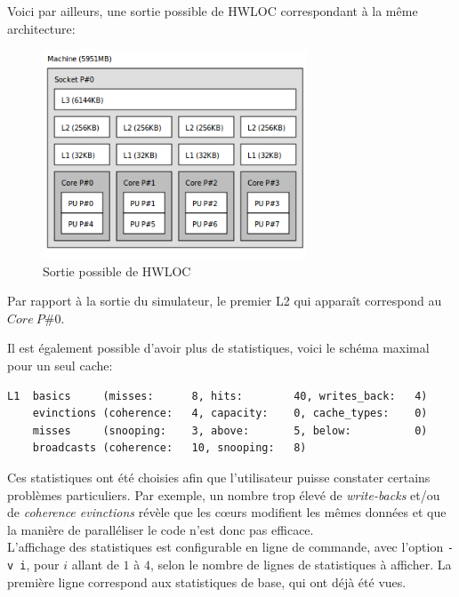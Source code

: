 Voici par ailleurs, une sortie possible de \textsf{HWLOC} correspondant à la même architecture: \\
\begin{figure}[H]
\begin{center}
   \includegraphics[width=0.7\textwidth]{images/lstopo.png}
   \caption{\label{img:archi} Sortie possible de \textsf{HWLOC}}
\end{center}
\end{figure}

Par rapport à la sortie du simulateur, le premier L2 qui apparaît correspond au $Core \ P\#0$.

Il est également possible d'avoir plus de statistiques, voici le schéma maximal pour un seul cache:
\begin{lstlisting}
L1  basics     (misses:      8, hits:        40, writes_back:   4)
    evinctions (coherence:   4, capacity:    0, cache_types:    0)
    misses     (snooping:    3, above:       5, below:          0)
    broadcasts (coherence:   10, snooping:   8)
\end{lstlisting}


Ces statistiques ont été choisies afin que l'utilisateur puisse constater certains problèmes particuliers. Par exemple, un nombre trop élevé de \emph{write-backs} et/ou de \emph{coherence evinctions} révèle que les c\oe urs modifient les mêmes données et que la manière de paralléliser le code n'est donc pas efficace. \\

L'affichage des statistiques est configurable en ligne de commande, avec l'option \texttt{-v i}, pour $i$ allant de $1$ à $4$, selon le nombre de lignes de statistiques à afficher. La première ligne correspond aux statistiques de base, qui ont déjà été vues. \\

